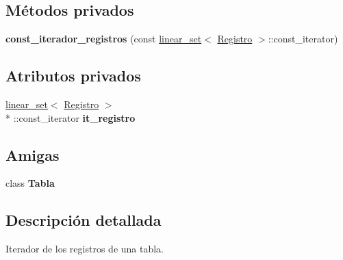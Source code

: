 \subsection*{Métodos privados}
\begin{DoxyCompactItemize}
\item 
\hypertarget{classTabla_1_1const__iterador__registros_a8dde708af2d71cf5dabfd3b42d15284f}{{\bfseries const\+\_\+iterador\+\_\+registros} (const \hyperlink{classlinear__set}{linear\+\_\+set}$<$ \hyperlink{classRegistro}{Registro} $>$\+::const\+\_\+iterator)}\label{classTabla_1_1const__iterador__registros_a8dde708af2d71cf5dabfd3b42d15284f}

\end{DoxyCompactItemize}
\subsection*{Atributos privados}
\begin{DoxyCompactItemize}
\item 
\hypertarget{classTabla_1_1const__iterador__registros_ab650d9f113456460fca266d31dffa484}{\hyperlink{classlinear__set}{linear\+\_\+set}$<$ \hyperlink{classRegistro}{Registro} $>$\\*
\+::const\+\_\+iterator {\bfseries it\+\_\+registro}}\label{classTabla_1_1const__iterador__registros_ab650d9f113456460fca266d31dffa484}

\end{DoxyCompactItemize}
\subsection*{Amigas}
\begin{DoxyCompactItemize}
\item 
\hypertarget{classTabla_1_1const__iterador__registros_a172484163cb8b80140c3053a4c68e4da}{class {\bfseries Tabla}}\label{classTabla_1_1const__iterador__registros_a172484163cb8b80140c3053a4c68e4da}

\end{DoxyCompactItemize}


\subsection{Descripción detallada}
Iterador de los registros de una tabla. 

